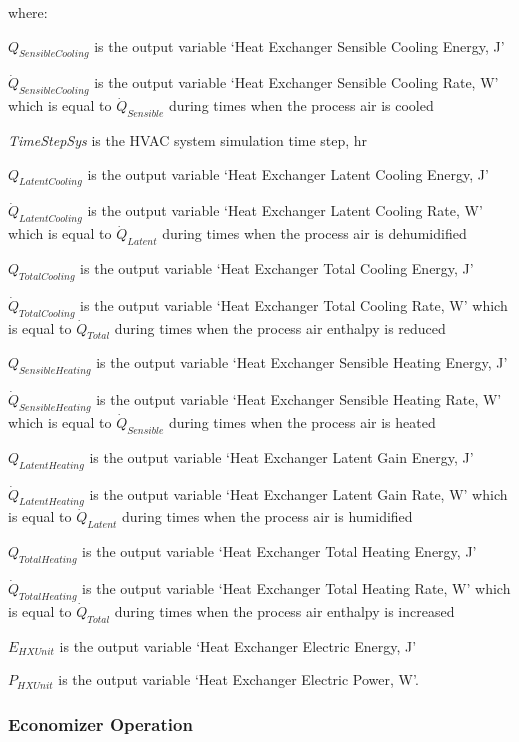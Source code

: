 where:

\(Q_{SensibleCooling}\) is the output variable `Heat Exchanger Sensible Cooling Energy, J'

\({\dot Q_{SensibleCooling}}\) is the output variable `Heat Exchanger Sensible Cooling Rate, W' which is equal to \({\dot Q_{Sensible}}\) during times when the process air is cooled

\emph{TimeStepSys} is the HVAC system simulation time step, hr

\(Q_{LatentCooling}\) is the output variable `Heat Exchanger Latent Cooling Energy, J'

\({\dot Q_{LatentCooling}}\) is the output variable `Heat Exchanger Latent Cooling Rate, W' which is equal to \({\dot Q_{Latent}}\) during times when the process air is dehumidified

\(Q_{TotalCooling}\) is the output variable `Heat Exchanger Total Cooling Energy, J'

\({\dot Q_{TotalCooling}}\) is the output variable `Heat Exchanger Total Cooling Rate, W' which is equal to \({\dot Q_{Total}}\) during times when the process air enthalpy is reduced

\(Q_{SensibleHeating}\) is the output variable `Heat Exchanger Sensible Heating Energy, J'

\({\dot Q_{SensibleHeating}}\) is the output variable `Heat Exchanger Sensible Heating Rate, W' which is equal to \({\dot Q_{Sensible}}\) during times when the process air is heated

\(Q_{LatentHeating}\) is the output variable `Heat Exchanger Latent Gain Energy, J'

\({\dot Q_{LatentHeating}}\) is the output variable `Heat Exchanger Latent Gain Rate, W' which is equal to \({\dot Q_{Latent}}\) during times when the process air is humidified

\(Q_{TotalHeating}\) is the output variable `Heat Exchanger Total Heating Energy, J'

\({\dot Q_{TotalHeating}}\) is the output variable `Heat Exchanger Total Heating Rate, W' which is equal to \({\dot Q_{Total}}\) during times when the process air enthalpy is increased

\({E_{HXUnit}}\) is the output variable `Heat Exchanger Electric Energy, J'

\({P_{HXUnit}}\) is the output variable `Heat Exchanger Electric Power, W'.

\subsubsection{Economizer Operation}\label{economizer-operation-2}

